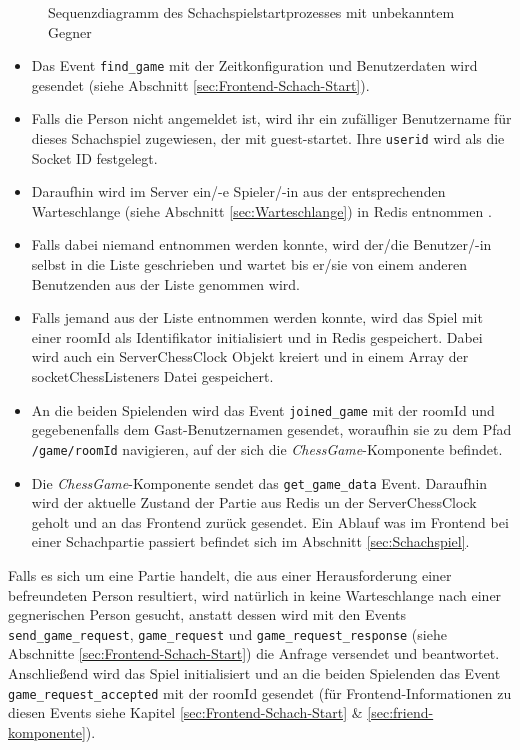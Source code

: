 \begin{figure}[!htbp]
\begin{adjustbox}{height=\textheight}
\begin{sequencediagram}
    
    
  \end{sequencediagram}
  \end{adjustbox}
  
  \caption{Sequenzdiagramm des Schachspielstartprozesses mit unbekanntem Gegner}
  \label{fig:sequence_chess_start}
\end{figure}


\begin{itemize}
\item Das Event \verb|find_game| mit der Zeitkonfiguration und Benutzerdaten wird gesendet (siehe Abschnitt \ref{sec:Frontend-Schach-Start}).
\item Falls die Person nicht angemeldet ist, wird ihr  ein zufälliger Benutzername für dieses Schachspiel zugewiesen, der mit \glqq guest-\grqq{ }startet. Ihre \verb|userid| wird als die Socket ID festgelegt.
\item Daraufhin wird im Server ein/-e Spieler/-in aus der entsprechenden Warteschlange (siehe Abschnitt \ref{sec:Warteschlange}) in Redis entnommen .
\item Falls dabei niemand entnommen werden konnte, wird der/die Benutzer/-in selbst in die Liste geschrieben und wartet bis er/sie von einem anderen Benutzenden aus der Liste genommen wird.
\item Falls jemand aus der Liste entnommen werden konnte, wird das Spiel mit einer roomId als Identifikator initialisiert und in Redis gespeichert. Dabei wird auch ein ServerChessClock Objekt kreiert und in einem Array der socketChessListeners Datei gespeichert.
\item An die beiden Spielenden wird das Event \verb|joined_game| mit der roomId und gegebenenfalls dem Gast-Benutzernamen gesendet, woraufhin sie zu dem Pfad \verb|/game/roomId| navigieren, auf der sich die \textit{ChessGame}-Komponente befindet.
\item Die \textit{ChessGame}-Komponente sendet das \verb|get_game_data| Event. Daraufhin wird der aktuelle Zustand der Partie aus Redis un der ServerChessClock geholt und an das Frontend zurück gesendet. Ein Ablauf was im Frontend bei einer Schachpartie passiert befindet sich im Abschnitt \ref{sec:Schachspiel}.
\end{itemize}

Falls es sich um eine Partie handelt, die aus einer Herausforderung einer befreundeten Person resultiert, wird natürlich in keine Warteschlange nach einer gegnerischen Person gesucht, anstatt dessen wird mit den Events \verb|send_game_request|, \verb|game_request| und \verb|game_request_response| (siehe Abschnitte \ref{sec:Frontend-Schach-Start}) die Anfrage versendet und beantwortet. Anschließend wird das Spiel initialisiert und an die beiden Spielenden das Event \verb|game_request_accepted| mit der roomId gesendet (für Frontend-Informationen zu diesen Events siehe Kapitel \ref{sec:Frontend-Schach-Start} \& \ref{sec:friend-komponente}).

